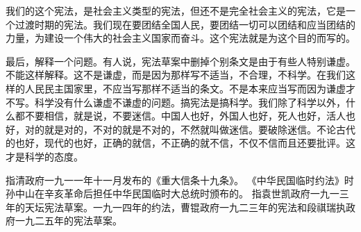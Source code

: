 我们的这个宪法，是社会主义类型的宪法，但还不是完全社会主义的宪法，它是一个过渡时期的宪法。我们现在要团结全国人民，要团结一切可以团结和应当团结的力量，为建设一个伟大的社会主义国家而奋斗。这个宪法就是为这个目的而写的。

最后，解释一个问题。有人说，宪法草案中删掉个别条文是由于有些人特别谦虚。不能这样解释。这不是谦虚，而是因为那样写不适当，不合理，不科学。在我们这样的人民民主国家里，不应当写那样不适当的条文。不是本来应当写而因为谦虚才不写。科学没有什么谦虚不谦虚的问题。搞宪法是搞科学。我们除了科学以外，什么都不要相信，就是说，不要迷信。中国人也好，外国人也好，死人也好，活人也好，对的就是对的，不对的就是不对的，不然就叫做迷信。要破除迷信。不论古代的也好，现代的也好，正确的就信，不正确的就不信，不仅不信而且还要批评。这才是科学的态度。


\begin{maonote}
指清政府一九一一年十一月发布的《重大信条十九条》。
《中华民国临时约法》时孙中山在辛亥革命后担任中华民国临时大总统时颁布的。
指袁世凯政府一九一三年的天坛宪法草案。一九一四年的约法，曹锟政府一九二三年的宪法和段祺瑞执政府一九二五年的宪法草案。
\end{maonote}
